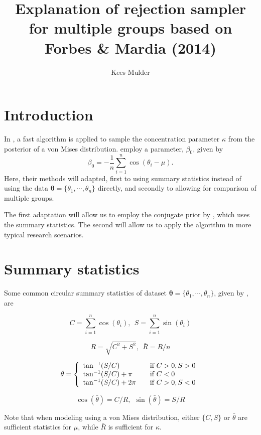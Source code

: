 \documentclass[12pt,a4paper]{article}
\author{Kees Mulder}
\title{Explanation of rejection sampler for multiple groups based on Forbes \& Mardia (2014)}
\begin{document}
\maketitle

\section*{Introduction}

In \citet{forbes2014fast}, a fast algorithm is applied to sample the concentration parameter $\kappa$ from the posterior of a von Mises distribution. \citet{forbes2014fast} employ a parameter, $\beta_0$, given by
$$ \beta_0 = - \frac{1}{n} \sum_{i=1}^{n} \cos(\theta_i - \mu).$$
Here, their methods will adapted, first to using summary statistics instead of using the data $\boldsymbol{\theta}= \{ \theta_1, \cdots, \theta_n\}$ directly, and secondly to allowing for comparison of multiple groups. 

The first adaptation will allow us to employ the conjugate prior by \citet{guttorp1988finding}, which uses the summary statistics. The second will allow us to apply the algorithm in more typical research scenarios.

\section*{Summary statistics}

Some common circular summary statistics of dataset $\boldsymbol{\theta}= \{ \theta_1, \cdots, \theta_n\}$, given by \citet{fisher1995statistical}, are

$$ C = \sum_{i=1}^{n}\cos(\theta_i), ~~ S = \sum_{i=1}^{n}\sin(\theta_i) $$

$$ R = \sqrt{C^2 + S^2}, ~~ \bar{R} = R/n $$

$$ \bar{\theta} = \left\{ 
  \begin{array}{l l}
   \tan^{-1} (S/C) & \quad \textnormal{if}~ \text{$C > 0, S > 0$}\\
   \tan^{-1} (S/C) + \pi & \quad \textnormal{if}~ \text{$C < 0$}\\ 
   \tan^{-1} (S/C) + 2\pi & \quad \textnormal{if}~ \text{$C > 0, S < 0$}
  \end{array} \right.$$

$$ \cos(\bar{\theta}) = C/R, ~~ \sin(\bar{\theta}) = S/R $$

Note that when modeling using a von Mises distribution, either $\{C, S\}$ or $\bar{\theta}$ are sufficient statistics for $\mu$, while $\bar{R}$ is sufficient for $\kappa$. 
\end{document}
